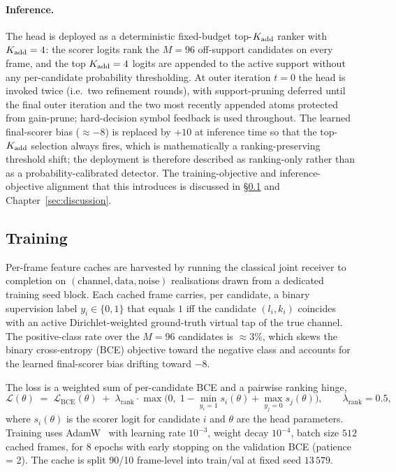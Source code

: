 \paragraph{Inference.}
The head is deployed as a deterministic fixed-budget top-$K_{\mathrm{add}}$ ranker with $K_{\mathrm{add}} = 4$: the scorer logits rank the $M = 96$ off-support candidates on every frame, and the top $K_{\mathrm{add}} = 4$ logits are appended to the active support without any per-candidate probability thresholding. At outer iteration $t = 0$ the head is invoked twice (i.e.\ two refinement rounds), with support-pruning deferred until the final outer iteration and the two most recently appended atoms protected from gain-prune; hard-decision symbol feedback is used throughout. The learned final-scorer bias ($\approx -8$) is replaced by $+10$ at inference time so that the top-$K_{\mathrm{add}}$ selection always fires, which is mathematically a ranking-preserving threshold shift; the deployment is therefore described as ranking-only rather than as a probability-calibrated detector. The training-objective and inference-objective alignment that this introduces is discussed in \S\ref{ssec:training} and Chapter~\ref{sec:discussion}.

\subsection{Training}
\label{ssec:training}

Per-frame feature caches are harvested by running the classical joint receiver to completion on $(\mathrm{channel}, \mathrm{data}, \mathrm{noise})$ realisations drawn from a dedicated training seed block. Each cached frame carries, per candidate, a binary supervision label $y_i \in \{0, 1\}$ that equals $1$ iff the candidate $(l_i, k_i)$ coincides with an active Dirichlet-weighted ground-truth virtual tap of the true channel. The positive-class rate over the $M = 96$ candidates is $\approx 3\%$, which skews the binary cross-entropy (BCE) objective toward the negative class and accounts for the learned final-scorer bias drifting toward $-8$.

The loss is a weighted sum of per-candidate BCE and a pairwise ranking hinge,
\begin{equation}
\mathcal{L}(\theta) \;=\; \mathcal{L}_{\text{BCE}}(\theta) \;+\; \lambda_{\text{rank}} \cdot \max\bigl(0,\; 1 - \min_{y_i=1} s_i(\theta) + \max_{y_j=0} s_j(\theta)\bigr), \qquad \lambda_{\text{rank}} = 0.5, \label{eq:loss}
\end{equation}
where $s_i(\theta)$ is the scorer logit for candidate $i$ and $\theta$ are the head parameters. Training uses AdamW~\cite{loshchilov2019adamw} with learning rate $10^{-3}$, weight decay $10^{-4}$, batch size $512$ cached frames, for 8 epochs with early stopping on the validation BCE (patience = 2). The cache is split 90/10 frame-level into train/val at fixed seed $13\,579$.

